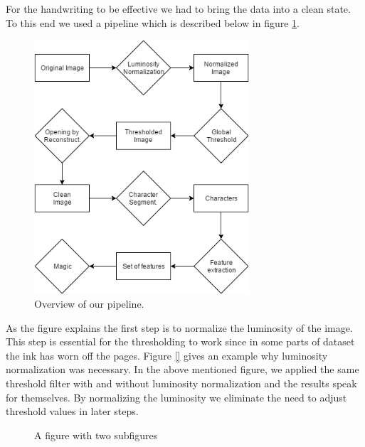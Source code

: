 For the handwriting to be effective we had to bring the data into a clean state. To this end we used a pipeline which is described below in figure \ref{fig:pipeline}. 

\begin{figure}[ht]
\label{fig:pipeline}
\includegraphics[width=8cm]{shared/img/pipeline.png}
\caption{Overview of our pipeline.}
\end{figure}

As the figure explains the first step is to normalize the luminosity of the image. This step is essential for the thresholding to work since in some parts of dataset the ink has worn off the pages. Figure \ref{} gives an example why luminosity normalization was necessary. In the above mentioned figure, we applied the same threshold filter with and without luminosity normalization and the results speak for themselves. By normalizing the luminosity we eliminate the need to adjust threshold values in later steps.

\begin{figure}
\centering
{}
\hfil
{}
\caption{A figure with two subfigures}
\label{fig:test}
\end{figure}

